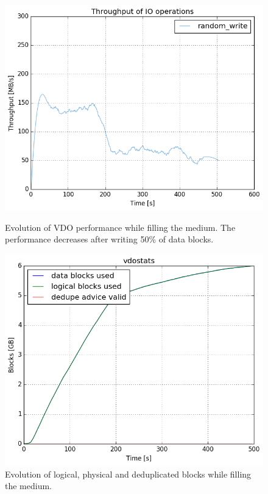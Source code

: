 \documentclass[
  color, %
  table, %
  lof,   %
  lot,   %
]{fithesis3}
\begin{document}
\begin{figure}[!htb]
        \centering
        \includegraphics[width=\textwidth]{../results/steady/korben/nice/report/tar_829_bw.png}
\caption[Evolution of VDO performance while filling the medium]{Evolution of VDO performance while filling the medium. The performance decreases after writing 50\% of data blocks.}
\label{fig:half-evol}
        \centering
        \includegraphics[width=\textwidth]{../results/steady/korben/nice/report/tar_829_vdostats.png}
\caption[Evolution of VDO block utilization while filling the medium]{Evolution of logical, physical and deduplicated blocks while filling the medium.}
\label{fig:half-evol-vdostats}
\end{figure}
\end{document}
